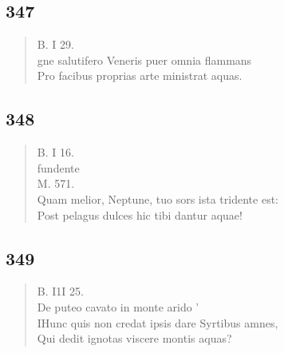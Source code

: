 \documentclass[11pt, a4paper]{report}
\begin{document}
            \subsection*{347}
      \begin{verse}
      B. I 29. \\ gne salutifero Veneris puer omnia flammans \\ Pro facibus proprias arte ministrat aquas. \\ 
      \end{verse}
  
            \subsection*{348}
      \begin{verse}
      B. I 16. \\ fundente \\ M. 571. \\ Quam melior, Neptune, tuo sors ista tridente est: \\ Post pelagus dulces hic tibi dantur aquae! \\ 
      \end{verse}
  
            \subsection*{349}
      \begin{verse}
      B. I1I 25. \\ De puteo cavato in monte arido ’ \\ IHunc quis non credat ipsis dare Syrtibus amnes, \\ Qui dedit ignotas viscere montis aquas? \\ 
      \end{verse}
  
\end{document}

